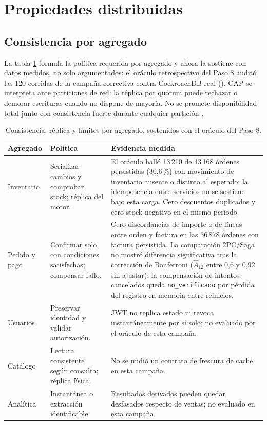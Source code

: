 \documentclass[12pt,a4paper]{article}
\newcommand{\seccion}[1]{\section{#1}}
\begin{document}
\seccion{Propiedades distribuidas}
\subsection{Consistencia por agregado}
La tabla \ref{tab:cap} formula la política requerida por agregado y ahora la sostiene con datos medidos, no solo argumentados: el oráculo retrospectivo del Paso 8 auditó las 120 corridas de la campaña correctiva contra CockroachDB real (). CAP se interpreta ante particiones de red: la réplica por quórum puede rechazar o demorar escrituras cuando no dispone de mayoría. No se promete disponibilidad total junto con consistencia fuerte durante cualquier partición \cite{gilbert2002,brewer2012cap,abadi2012consistency}.

\begin{table}[H]\centering\small
\caption{Consistencia, réplica y límites por agregado, sostenidos con el oráculo del Paso 8.}\label{tab:cap}
\begin{tabularx}{\textwidth}{lXX}
\toprule Agregado & Política & Evidencia medida\\\midrule
Inventario & Serializar cambios y comprobar stock; réplica del motor. & El oráculo halló 13\,210 de 43\,168 órdenes persistidas (30,6\,\%) con movimiento de inventario ausente o distinto al esperado: la idempotencia entre servicios no se sostiene bajo esta carga. Cero descuentos duplicados y cero stock negativo en el mismo periodo.\\
Pedido y pago & Confirmar solo con condiciones satisfechas; compensar fallo. & Cero discordancias de importe o de líneas entre orden y factura en las 36\,878 órdenes con factura persistida. La comparación 2PC/Saga no mostró diferencia significativa tras la corrección de Bonferroni ($\hat{A}_{12}$ entre 0,6 y 0,92 sin ajustar); la compensación de intentos cancelados queda \texttt{no\_verificado} por pérdida del registro en memoria entre reinicios.\\
Usuarios & Preservar identidad y validar autorización. & JWT no replica estado ni revoca instantáneamente por sí solo; no evaluado por el oráculo de esta campaña.\\
Catálogo & Lectura consistente según consulta; réplica física. & No se midió un contrato de frescura de caché en esta campaña.\\
Analítica & Instantánea o extracción identificable. & Resultados derivados pueden quedar desfasados respecto de ventas; no evaluado en esta campaña.\\\bottomrule
\end{tabularx}
\end{table}
\end{document}
